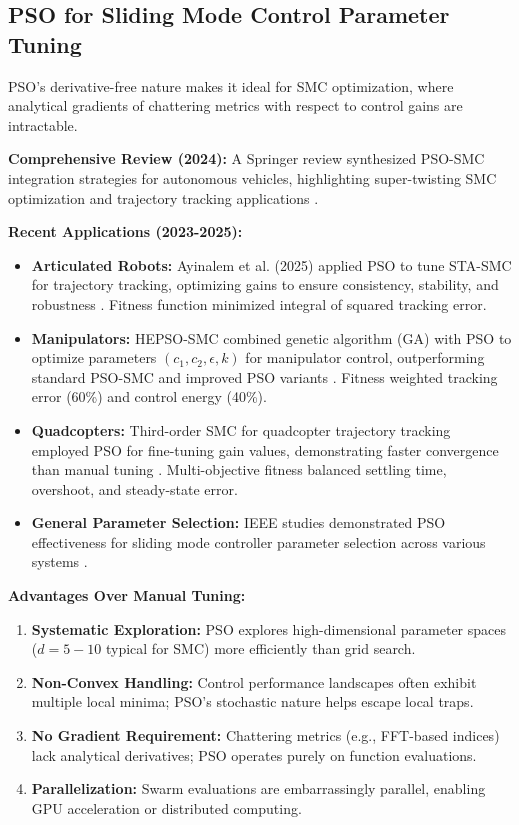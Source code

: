 \subsection{PSO for Sliding Mode Control Parameter Tuning}

PSO's derivative-free nature makes it ideal for SMC optimization, where analytical gradients of chattering metrics with respect to control gains are intractable.

\textbf{Comprehensive Review (2024):} A Springer review synthesized PSO-SMC integration strategies for autonomous vehicles, highlighting super-twisting SMC optimization and trajectory tracking applications \cite{springer2024pso}.

\textbf{Recent Applications (2023-2025):}

\begin{itemize}
\item \textbf{Articulated Robots:} Ayinalem et al. (2025) applied PSO to tune STA-SMC for trajectory tracking, optimizing gains to ensure consistency, stability, and robustness \cite{ayinalem2025pso}. Fitness function minimized integral of squared tracking error.

\item \textbf{Manipulators:} HEPSO-SMC combined genetic algorithm (GA) with PSO to optimize parameters $(c_1, c_2, \epsilon, k)$ for manipulator control, outperforming standard PSO-SMC and improved PSO variants \cite{hepso2025manipulator}. Fitness weighted tracking error (60\%) and control energy (40\%).

\item \textbf{Quadcopters:} Third-order SMC for quadcopter trajectory tracking employed PSO for fine-tuning gain values, demonstrating faster convergence than manual tuning \cite{mdpi2025quadcopter}. Multi-objective fitness balanced settling time, overshoot, and steady-state error.

\item \textbf{General Parameter Selection:} IEEE studies demonstrated PSO effectiveness for sliding mode controller parameter selection across various systems \cite{ieee2020pso,ieee2020design}.
\end{itemize}

\textbf{Advantages Over Manual Tuning:}
\begin{enumerate}
\item \textbf{Systematic Exploration:} PSO explores high-dimensional parameter spaces ($d = 5-10$ typical for SMC) more efficiently than grid search.
\item \textbf{Non-Convex Handling:} Control performance landscapes often exhibit multiple local minima; PSO's stochastic nature helps escape local traps.
\item \textbf{No Gradient Requirement:} Chattering metrics (e.g., FFT-based indices) lack analytical derivatives; PSO operates purely on function evaluations.
\item \textbf{Parallelization:} Swarm evaluations are embarrassingly parallel, enabling GPU acceleration or distributed computing.
\end{enumerate}


